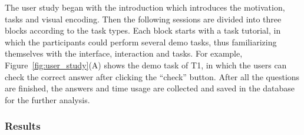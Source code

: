 The user study began with the introduction which introduces the motivation, tasks and visual encoding. Then the following sessions are divided into three blocks according to the task types. Each block starts with a task tutorial, in which the participants could perform several demo tasks, thus familiarizing themselves with the interface, interaction and tasks. For example, Figure~\ref{fig:user_study}(A) shows the demo task of T1, in which the users can check the correct answer after clicking the ``check'' button. After all the questions are finished, the answers and time usage are collected and saved in the database for the further analysis. 


\subsubsection{Results}



